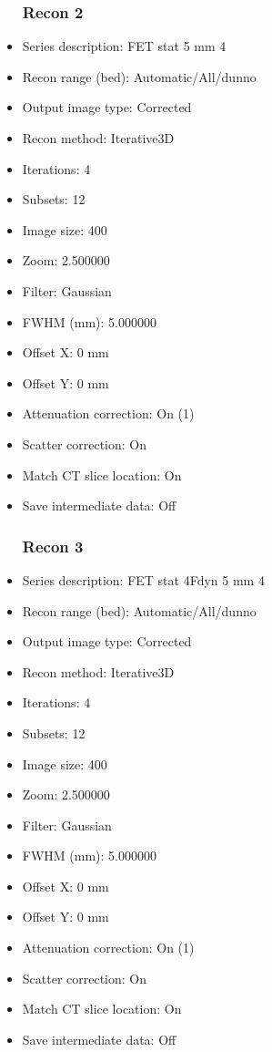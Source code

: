 \documentclass[12pt]{article}
\begin{document}
\begin{itemize}
\subsubsection{Recon 2}
\item Series description: FET stat 5 mm 4
\item Recon range (bed): Automatic/All/dunno
\item Output image type: Corrected
\item Recon method: Iterative3D
\item Iterations: 4
\item Subsets: 12
\item Image size: 400
\item Zoom: 2.500000
\item Filter: Gaussian
\item FWHM (mm): 5.000000
\item Offset X: 0 mm
\item Offset Y: 0 mm
\item Attenuation correction: On (1)
\item Scatter correction: On
\item Match CT slice location: On
\item Save intermediate data: Off
\subsubsection{Recon 3}
\item Series description: FET stat 4Fdyn 5 mm 4
\item Recon range (bed): Automatic/All/dunno
\item Output image type: Corrected
\item Recon method: Iterative3D
\item Iterations: 4
\item Subsets: 12
\item Image size: 400
\item Zoom: 2.500000
\item Filter: Gaussian
\item FWHM (mm): 5.000000
\item Offset X: 0 mm
\item Offset Y: 0 mm
\item Attenuation correction: On (1)
\item Scatter correction: On
\item Match CT slice location: On
\item Save intermediate data: Off

\end{itemize}
\end{document}
